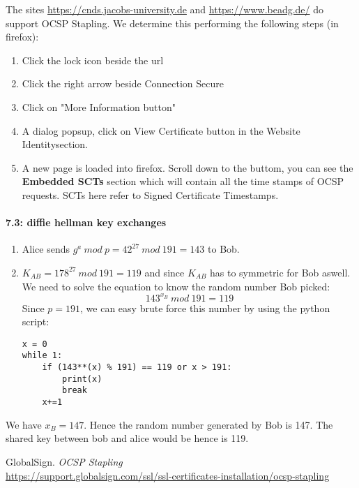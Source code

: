 \documentclass[a4paper]{article}
\begin{document}
\begin{enumerate}[label=(\alph*)]
        The sites \url{https://cnds.jacobs-university.de} and \url{https://www.beadg.de/} do support OCSP Stapling. We determine this performing the following steps (in firefox):
        \begin{enumerate}[label=(\alph*)]
            \item Click the lock icon beside the url
            \item Click the right arrow beside {\color{yellow} Connection Secure}
            \item Click on "More Information button"
            \item A dialog popsup, click on View Certificate button in the Website Identitysection.
            \item A new page is loaded into firefox. Scroll down to the buttom, you can see the \textbf{Embedded SCTs} section which will contain all the time stamps of OCSP requests. SCTs here refer to Signed Certificate Timestamps.
        \end{enumerate}
\end{enumerate}

\paragraph*{7.3: diffie hellman key exchanges}
\begin{enumerate}[label=(\alph*)]
    \item Alice sends $ g^{a}\ mod\ p = 42^{27}\ mod\ 191 = 143 $ to Bob.
    \item $K_{AB} = 178^{27}\ mod\ 191 = 119$ and since $K_{AB}$ has to symmetric for Bob aswell. We need to solve the equation to know the random number Bob picked:
        $$ 143^{x_B}\ mod\ 191 = 119$$
Since $p=191$, we can easy brute force this number by using the python script:
            \begin{verbatim}
x = 0
while 1:
    if (143**(x) % 191) == 119 or x > 191:
        print(x)
        break
    x+=1
            \end{verbatim}
\end{enumerate}
We have $x_{B} = 147$. Hence the random number generated by Bob is 147. The shared key between bob and alice would be hence is 119.


\begin{thebibliography}{9}
GlobalSign.
\textit{OCSP Stapling}\\
\url{https://support.globalsign.com/ssl/ssl-certificates-installation/ocsp-stapling}
\end{thebibliography}
\end{document}
